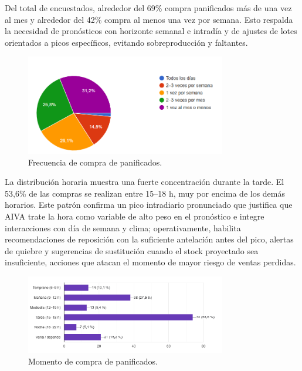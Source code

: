 Del total de encuestados, alrededor del 69\% compra panificados más de una vez al mes y alrededor del 42\% compra al menos una vez por semana. Esto respalda la necesidad de pronósticos con horizonte semanal e intradía y de ajustes de lotes orientados a picos específicos, evitando sobreproducción y faltantes.

\begin{figure}[t]
    \centering
    \includegraphics[width=0.78\textwidth]{images/FrecuenciaCompraPanificados.png}
    \caption{Frecuencia de compra de panificados.}
    \label{fig:frecuencia-compra-panificados}
\end{figure}

La distribución horaria muestra una fuerte concentración durante la tarde. El 53,6\% de las compras se realizan entre 15–18 h, muy por encima de los demás horarios. Este patrón confirma un pico intradiario pronunciado que justifica que AIVA trate la hora como variable de alto peso en el pronóstico e integre interacciones con día de semana y clima; operativamente, habilita recomendaciones de reposición con la suficiente antelación antes del pico, alertas de quiebre y sugerencias de sustitución cuando el stock proyectado sea insuficiente, acciones que atacan el momento de mayor riesgo de ventas perdidas.

\begin{figure}[t]
    \centering
    \includegraphics[width=0.78\textwidth]{images/MomentoDeCompra.png}
    \caption{Momento de compra de panificados.}
    \label{fig:momento-compra}
\end{figure}


